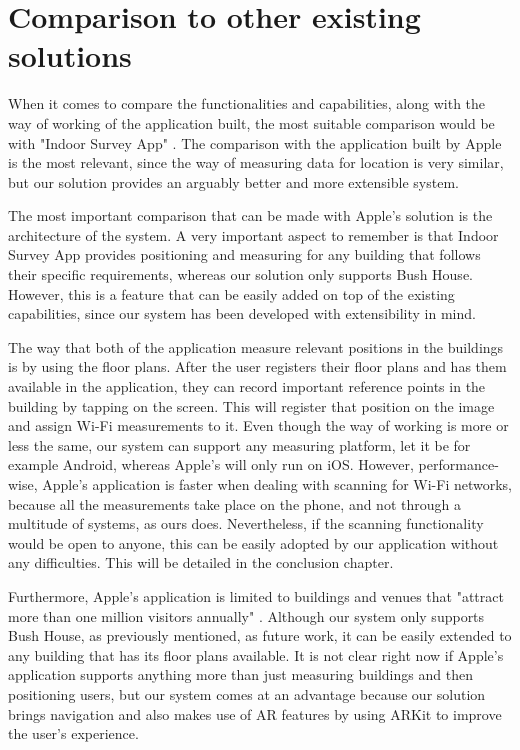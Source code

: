 

\section{Comparison to other existing solutions}
When it comes to compare the functionalities and capabilities, along with the way of working of the application built, the most suitable comparison would be with "Indoor Survey App" \cite{apple-indoor-survey}. The comparison with the application built by Apple is the most relevant, since the way of measuring data for location is very similar, but our solution provides an arguably better and more extensible system.

The most important comparison that can be made with Apple's solution is the architecture of the system. A very important aspect to remember is that Indoor Survey App provides positioning and measuring for any building that follows their specific requirements, whereas our solution only supports Bush House. However, this is a feature that can be easily added on top of the existing capabilities, since our system has been developed with extensibility in mind.

The way that both of the application measure relevant positions in the buildings is by using the floor plans. After the user registers their floor plans and has them available in the application, they can record important reference points in the building by tapping on the screen. This will register that position on the image and assign Wi-Fi measurements to it. Even though the way of working is more or less the same, our system can support any measuring platform, let it be for example Android, whereas Apple's will only run on iOS. However, performance-wise, Apple's application is faster when dealing with scanning for Wi-Fi networks, because all the measurements take place on the phone, and not through a multitude of systems, as ours does. Nevertheless, if the scanning functionality would be open to anyone, this can be easily adopted by our application without any difficulties. This will be detailed in the conclusion chapter.

Furthermore, Apple's application is limited to buildings and venues that "attract more than one million visitors annually" \cite{apple-indoor-survey}. Although our system only supports Bush House, as previously mentioned, as future work, it can be easily extended to any building that has its floor plans available. It is not clear right now if Apple's application supports anything more than just measuring buildings and then positioning users, but our system comes at an advantage because our solution brings navigation and also makes use of AR features by using ARKit to improve the user's experience.

